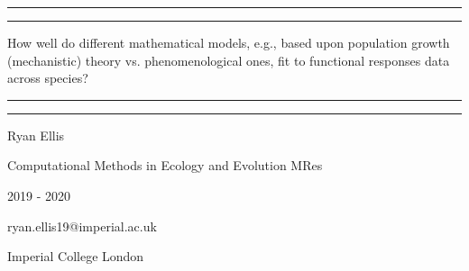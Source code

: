 \documentclass[11pt, a4paper]{article} %
\begin{document}
\begin{titlepage} %

	\centering %
	
	\vspace*{\baselineskip} %
	
	\rule{\textwidth}{1.6pt}\vspace*{-\baselineskip}\vspace*{2pt} %
	\rule{\textwidth}{0.4pt} %
	
	\vspace{0.75\baselineskip} %
	
	{\huge How well do different mathematical models, e.g., based upon population growth (mechanistic) theory vs. phenomenological ones, fit to functional responses data across species?} %
	
	\vspace{0.75\baselineskip} %
	
	\rule{\textwidth}{0.4pt}\vspace*{-\baselineskip}\vspace{3.2pt} %
	\rule{\textwidth}{1.6pt} %
		
	\vspace{2\baselineskip} %
	
	{\LARGE Ryan Ellis} %
	\vspace*{0.75\baselineskip} %
	
	\Large %
	Computational Methods in Ecology and Evolution MRes
	\vspace*{0.75\baselineskip} %
	
	2019 - 2020
	\vspace*{0.75\baselineskip} %

	ryan.ellis19@imperial.ac.uk
	\vspace*{3\baselineskip} %
	
	Imperial College London
			
	
\end{titlepage}

\linenumbers %
\linespread{2} %
\end{document}
